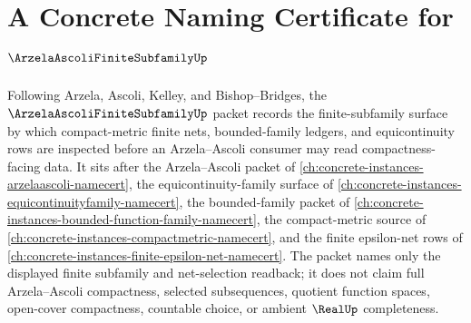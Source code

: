 \chapter{A Concrete Naming Certificate for $\ArzelaAscoliFiniteSubfamilyUp$}
\label{ch:concrete-instances-arzela-ascoli-finite-subfamily-namecert}

Following Arzela, Ascoli, Kelley, and Bishop--Bridges, the $\ArzelaAscoliFiniteSubfamilyUp$ packet records the finite-subfamily surface by which compact-metric finite nets, bounded-family ledgers, and equicontinuity rows are inspected before an Arzela--Ascoli consumer may read compactness-facing data. It sits after the Arzela--Ascoli packet of \autoref{ch:concrete-instances-arzelaascoli-namecert}, the equicontinuity-family surface of \autoref{ch:concrete-instances-equicontinuityfamily-namecert}, the bounded-family packet of \autoref{ch:concrete-instances-bounded-function-family-namecert}, the compact-metric source of \autoref{ch:concrete-instances-compactmetric-namecert}, and the finite epsilon-net rows of \autoref{ch:concrete-instances-finite-epsilon-net-namecert}. The packet names only the displayed finite subfamily and net-selection readback; it does not claim full Arzela--Ascoli compactness, selected subsequences, quotient function spaces, open-cover compactness, countable choice, or ambient $\RealUp$ completeness.

